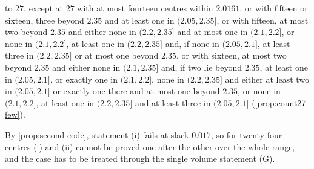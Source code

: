 \documentclass[11pt,reqno]{amsart}
\renewcommand{\_}{\origunderscore\allowbreak}
\numberwithin{equation}{section}
\theoremstyle{plain}
\theoremstyle{definition}
\theoremstyle{remark}
\begin{document}
\begin{enumerate}[label=\textup{(\roman*)},leftmargin=2.2em]
  to $27$, except at $27$ with at most fourteen centres within $2.0161$,
  or with fifteen or sixteen, three beyond $2.35$ and at least one in
  $(2.05,2.35]$, or with fifteen, at most two beyond $2.35$ and either none in
$(2.2,2.35]$ and at most one in $(2.1,2.2]$, or none in $(2.1,2.2]$, at least one in $(2.2,2.35]$ and, if none in $(2.05,2.1]$, at least three in $(2.2,2.35]$ or at most one beyond $2.35$, or with sixteen, at most two
beyond $2.35$ and either none in $(2.1,2.35]$ and, if two lie beyond $2.35$, at least one in $(2.05,2.1]$, or exactly one in $(2.1,2.2]$, none in $(2.2,2.35]$ and either at least two in $(2.05,2.1]$ or exactly one there and at most one beyond $2.35$, or none in $(2.1,2.2]$, at least one in $(2.2,2.35]$ and at least three in $(2.05,2.1]$ (\cref{prop:count27-few}).
\end{enumerate}
By \cref{prop:second-code}, statement (i) fails at slack $0.017$, so for
twenty-four centres (i) and (ii) cannot be proved one after the other over
the whole range, and the case has to be treated through the single volume
statement (G).
\end{document}
